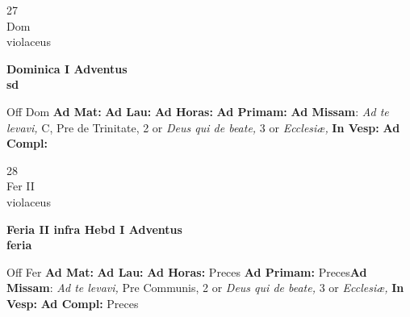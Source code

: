 \documentclass[10pt, openany]{book}
\begin{document}
    \begin{center}
        \begin{minipage}{3.5in}
            \vspace{2em}
            \begin{minipage}{0.5in}
                {\Huge 27} \\
                {\normalsize Dom} \\
                {\normalsize violaceus}
            \end{minipage}
            \begin{minipage}{3.0in}
                \textbf{ \large Dominica I Adventus \\
                \textnormal{\normalsize sd}} \\ 
            \end{minipage}
            \begin{justify}Off Dom
                \textbf{Ad Mat: }
                \textbf{Ad Lau: }
                \textbf{Ad Horas: }
                \textbf{Ad Primam: }\textbf{Ad Missam}: \textit{Ad te levavi,} C, Pre de Trinitate, 2 or \textit{Deus qui de beate,} 3 or \textit{Ecclesiæ,}  
                \textbf{In Vesp: }
                \textbf{Ad Compl: }
            \end{justify}
        \end{minipage}
    \end{center}

    \begin{center}
        \begin{minipage}{3.5in}
            \vspace{2em}
            \begin{minipage}{0.5in}
                {\Huge 28} \\
                {\normalsize Fer II} \\
                {\normalsize violaceus}
            \end{minipage}
            \begin{minipage}{3.0in}
                \textbf{ \large Feria II infra Hebd I Adventus \\
                \textnormal{\normalsize feria}} \\ 
            \end{minipage}
            \begin{justify}Off Fer
                \textbf{Ad Mat: }
                \textbf{Ad Lau: }
                \textbf{Ad Horas: }Preces
                \textbf{Ad Primam: }Preces\textbf{Ad Missam}: \textit{Ad te levavi,} Pre Communis, 2 or \textit{Deus qui de beate,} 3 or \textit{Ecclesiæ,}  
                \textbf{In Vesp: }
                \textbf{Ad Compl: }Preces
            \end{justify}
        \end{minipage}
    \end{center}
\end{document}
